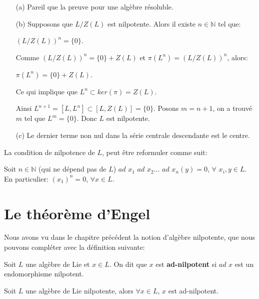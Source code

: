\documentclass[a4paper,openany,12pt]{report}
\newcommand{\NN}{\mathbb{N}}
\theoremstyle{break}
{\theorembodyfont{\upshape}
\newtheorem*{rmq}{Remarque :}
\newtheorem*{prv}{Preuve :}
\newtheorem*{ex}{Exemples :}
\newtheorem*{exe}{Exemple : }
\newtheorem*{nota}{Notation :}
\newtheorem*{dem}{D\'emonstration :}}
\begin{document}
\begin{prv}
\begin{itemize}
\item[(a)]  Pareil que la preuve pour une algèbre résoluble.
\item[(b)]  Supposons que $L/Z(L)$ est nilpotente. Alors il existe $n \in \NN$ tel que:
\begin{center}
$(L/Z(L))^{n}= \{ 0 \}$.
\end{center} 

Comme $(L/Z(L))^{n}= \{ 0 \} +Z(L)$ et $\pi(L^n) = (L/Z(L))^{n}$, alors:
\begin{center}
$\pi(L^n)= \{0\} +Z(L)$.
\end{center}
Ce qui implique que $L^n \subset ker(\pi)=Z(L)$.

Ainsi $L^{n+1}=[L,L^n]\subset [L,Z(L)]= \{0\}$. Posons $m = n+1$, on a trouvé $m$ tel que $L^m= \{0\}$. Donc $L$ est nilpotente.

\item[(c)] Le dernier terme non nul dans la série centrale descendante est le centre.
\end{itemize}
\end{prv}

\begin{rmq}
\quad La condition de nilpotence de $L$, peut être reformuler comme suit:

Soit $n \in \NN$ (qui ne dépend pas de $L$) $ad$ $x_{1}$ $ad$ $x_{2} \ldots$ $ad$ $x_{n}(y)=0$,  $\forall$ $x_{i}, y \in L$.
En particulier:
$(x_{1})^n=0$, $\forall x \in L$.
\end{rmq}

\chapter{Le théorème d'Engel}

\quad Nous avons vu dans le chapitre précédent la notion d'algèbre nilpotente, que nous pouvons compléter avec la définition suivante:

\begin{df}
\quad Soit $L$ une algèbre de Lie et $x \in L$. On dit que $x$ est \textbf{ad-nilpotent} si $ad$ $x$ est un endomorphisme nilpotent. 
\end{df}

\begin{prop}\label{prop:E1}
\quad Soit $L$ une algèbre de Lie nilpotente, alors $\forall x \in L$, $x$ est ad-nilpotent.
\end{prop}
\end{document}
